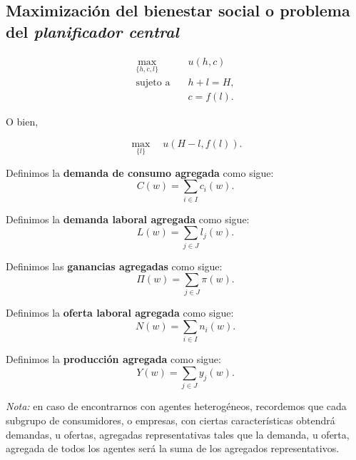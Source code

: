 \documentclass[8pt,a4paper]{extarticle}
\begin{document}
\begin{multicols}{3}
\newpage

\subsection{Maximización del bienestar social o problema del \emph{planificador central}}

\begin{equation*}
	\begin{aligned}
		\max_{\{h, c, l\}} \quad   & u(h, c) \\
		\text{sujeto a} \quad      & h + l = H, \\
							       & c = f(l).
	\end{aligned}
\end{equation*}

O bien,

\[
	\max_{\{l\}} \quad u(H - l, f(l))
.\] 

\begin{boxdef}
	Definimos la \textbf{demanda de consumo agregada} como sigue:
	\[
		C(w) = \sum_{i \in I} c_i(w)
	.\] 
\end{boxdef}

\begin{boxdef}
	Definimos la \textbf{demanda laboral agregada} como sigue:
	\[
		L(w) = \sum_{j \in J} l_j(w)
	.\] 
\end{boxdef}

\begin{boxdef}
	Definimos las \textbf{ganancias agregadas} como sigue:
	\[
		\Pi(w) = \sum_{j \in J} \pi(w)
	.\] 
\end{boxdef}

\begin{boxdef}
	Definimos la \textbf{oferta laboral agregada} como sigue:
	\[
		N(w) = \sum_{i \in I} n_i(w)
	.\] 
\end{boxdef}

\begin{boxdef}
	Definimos la \textbf{producción agregada} como sigue:
	\[
		Y(w) = \sum_{j \in J} y_j(w)
	.\] 
\end{boxdef}

\emph{Nota:} en caso de encontrarnos con agentes heterogéneos, recordemos que cada subgrupo de consumidores, o empresas, con ciertas características obtendrá demandas, u ofertas, agregadas representativas tales que la demanda, u oferta, agregada de todos los agentes será la suma de los agregados representativos.


\end{multicols}
\end{document}
